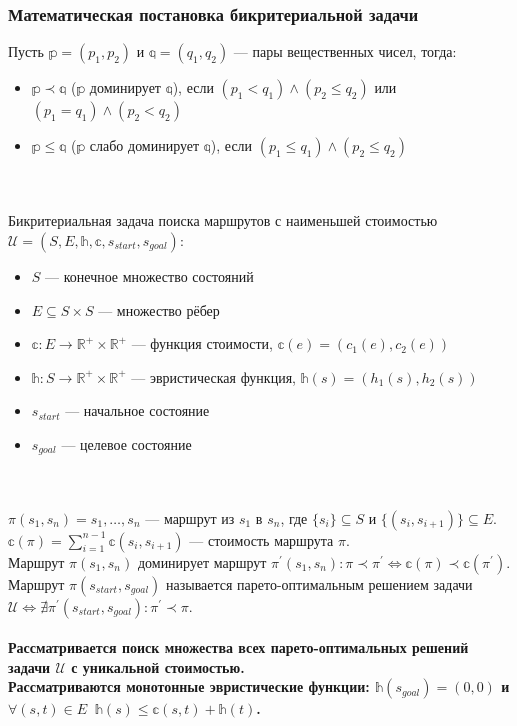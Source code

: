 \documentclass[aspectratio=169,8pt]{beamer}
\begin{document}
\begin{frame}
\frametitle{Математическая постановка бикритериальной задачи}
Пусть $\mathbb{p} = (p_1, p_2)$ и $\mathbb{q} = (q_1, q_2)$ --- пары вещественных чисел, тогда:
\begin{itemize}
\item $\mathbb{p} \prec \mathbb{q}$ ($\mathbb{p}$ доминирует $\mathbb{q}$), если $(p_1 < q_1) \wedge (p_2 \leq q_2)$ или $(p_1 = q_1) \wedge (p_2 < q_2)$
\item $\mathbb{p} \leq \mathbb{q}$ ($\mathbb{p}$ слабо доминирует $\mathbb{q}$), если $(p_1 \leq q_1) \wedge (p_2 \leq q_2)$
\end{itemize}
\ \\ \ \\
Бикритериальная задача поиска маршрутов с наименьшей стоимостью $\mathcal{U} = (S, E, \mathbb{h}, \mathbb{c}, s_{start}, s_{goal})$:
\begin{itemize}
\item $S$ --- конечное множество состояний
\item $E \subseteq S \times S$ --- множество рёбер
\item $\mathbb{c}: E \rightarrow \mathbb{R} ^ {+} \times \mathbb{R} ^ {+}$ --- функция стоимости, $\mathbb{c} (e) = (c_1(e), c_2(e))$
\item $\mathbb{h}: S \rightarrow \mathbb{R} ^ {+} \times \mathbb{R} ^ {+}$ --- эвристическая функция, $\mathbb{h} (s) = (h_1(s), h_2(s))$
\item $s_{start}$ --- начальное состояние
\item $s_{goal}$ --- целевое состояние
\end{itemize}
\ \\ \ \\
$\pi(s_1, s_n) = s_1, \dots, s_n$ --- маршрут из $s_1$ в $s_n$, где $\{s_i\} \subseteq S$ и $\{(s_i, s_{i + 1})\} \subseteq E$.\\
$\mathbb{c}(\pi) = \sum_{i = 1} ^ {n - 1} \mathbb{c} (s_i, s_{i + 1})$ --- стоимость маршрута $\pi$. \\
Маршрут $\pi(s_1, s_n)$ доминирует маршрут $\pi ^ {'}(s_1, s_n): \pi \prec \pi ^ {'} \Leftrightarrow \mathbb{c}(\pi) \prec \mathbb{c}(\pi ^ {'})$. \\
Маршрут $\pi(s_{start}, s_{goal})$ называется парето-оптимальным решением задачи $\mathcal{U} \Leftrightarrow \nexists \pi ^ {'}(s_{start}, s_{goal}): \pi ^ {'} \prec \pi$. \\ \ \\
\textbf{Рассматривается поиск множества всех парето-оптимальных решений задачи $\mathcal{U}$ с уникальной стоимостью.} \\
\textbf{Рассматриваются монотонные эвристические функции: $\mathbb{h}(s_{goal}) = (0, 0)$ и $\forall (s, t) \in E \;\; \mathbb{h}(s) \leq \mathbb{c}(s, t) + \mathbb{h}(t)$.}
\end{frame}
\end{document}
